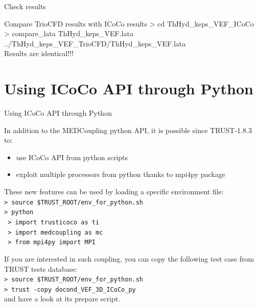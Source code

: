 \documentclass[10pt, hyperref={unicode=true,pdfusetitle, bookmarks=true,bookmarksnumbered=false,bookmarksopen=false, breaklinks=false,pdfborder={0 0 1},backref=true,colorlinks=true,linkcolor=darkblue,pageanchor, urlcolor=darkblue}]{beamer}
\begin{document}
\begin{frame}{Check results}

\begin{block}{Compare TrioCFD results with ICoCo results}
> cd ThHyd\_keps\_VEF\_ICoCo \\
> compare\_lata ThHyd\_keps\_VEF.lata ../ThHyd\_keps\_VEF\_TrioCFD/ThHyd\_keps\_VEF.lata \\
Results are identical!!!
\end{block}
\end{frame}
\section{{\bf{Using ICoCo API through Python}}}
\begin{frame}
\end{frame}
\begin{frame}{Using ICoCo API through Python}

\begin{block}{}
In addition to the MEDCoupling python API, it is possible since TRUST-1.8.3 to:
\begin{itemize}
\item use ICoCo API from python scripts
\item exploit multiple processors from python thanks to mpi4py package
\end{itemize}
These new features can be used by loading a specific environment file: \\
\texttt{> source \$TRUST\_ROOT/env\_for\_python.sh} \\
\texttt{> python} \\
\texttt{  > import trusticoco as ti }\\
\texttt{  > import medcoupling as mc}\\
\texttt{  > from mpi4py import MPI}


If you are interested in such coupling, you can copy the following test case from TRUST tests database:\\
\texttt{> source \$TRUST\_ROOT/env\_for\_python.sh} \\
\texttt{> trust -copy docond\_VEF\_3D\_ICoCo\_py} \\
and have a look at its prepare script.

\end{block}
\end{frame}
\end{document}
